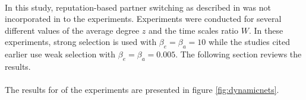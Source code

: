 \documentclass{article}
\begin{document}
	\paragraph{}In this study, reputation-based partner switching as described in \cite{Fu2008} was not incorporated in to the experiments.  Experiments were conducted for several different values of the average degree $z$ and the time scales ratio $W$.  In these experiments, strong selection is used with $\beta_e=\beta_a=10$ while the studies cited earlier use weak selection with $\beta_e=\beta_a=0.005$.  The following section reviews the results.
	\newpage

	\paragraph{} The results for of the experiments are presented in figure \ref{fig:dynamicnets}.
\end{document}
